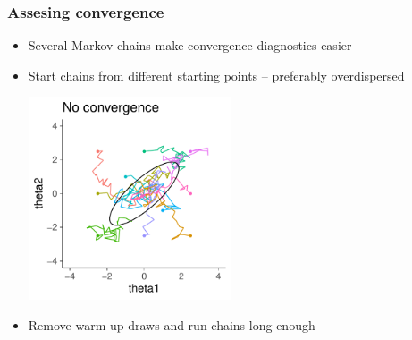 \documentclass[10pt]{beamer}
\begin{document}
\begin{frame}

\frametitle{Assesing convergence}

  \vspace{-0.5\baselineskip}
  \begin{itemize}
  \item Several Markov chains make convergence diagnostics easier
  \pause
    \item Start chains from different starting points -- preferably overdispersed
      \begin{center}
  \vspace{-0.5\baselineskip}
      \includegraphics[width=6cm]{figs/10chains1.pdf}
    \end{center}
  \vspace{-0.5\baselineskip}
    \item<2-> Remove warm-up draws and run chains long enough
  \end{itemize}

\end{frame}
\end{document}
